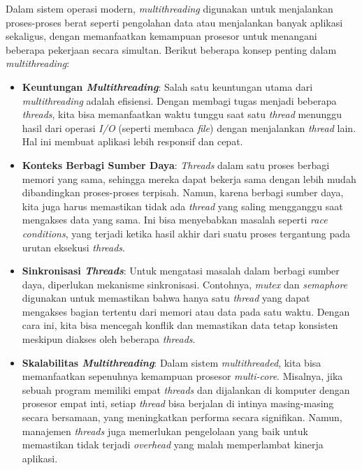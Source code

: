 \documentclass[12pt]{article}
\begin{document}
Dalam sistem operasi modern, \textit{multithreading} digunakan untuk menjalankan proses-proses berat seperti pengolahan data atau menjalankan banyak aplikasi sekaligus, dengan memanfaatkan kemampuan prosesor untuk menangani beberapa pekerjaan secara simultan. Berikut beberapa konsep penting dalam \textit{multithreading}:

\begin{itemize}
    \item \textbf{Keuntungan \textit{Multithreading}}: Salah satu keuntungan utama dari \textit{multithreading} adalah efisiensi. Dengan membagi tugas menjadi beberapa \textit{threads}, kita bisa memanfaatkan waktu tunggu saat satu \textit{thread} menunggu hasil dari operasi \textit{I/O} (seperti membaca \textit{file}) dengan menjalankan \textit{thread} lain. Hal ini membuat aplikasi lebih responsif dan cepat.

    \item \textbf{Konteks Berbagi Sumber Daya}: \textit{Threads} dalam satu proses berbagi memori yang sama, sehingga mereka dapat bekerja sama dengan lebih mudah dibandingkan proses-proses terpisah. Namun, karena berbagi sumber daya, kita juga harus memastikan tidak ada \textit{thread} yang saling mengganggu saat mengakses data yang sama. Ini bisa menyebabkan masalah seperti \textit{race conditions}, yang terjadi ketika hasil akhir dari suatu proses tergantung pada urutan eksekusi \textit{threads}.

    \item \textbf{Sinkronisasi \textit{Threads}}: Untuk mengatasi masalah dalam berbagi sumber daya, diperlukan mekanisme sinkronisasi. Contohnya, \textit{mutex} dan \textit{semaphore} digunakan untuk memastikan bahwa hanya satu \textit{thread} yang dapat mengakses bagian tertentu dari memori atau data pada satu waktu. Dengan cara ini, kita bisa mencegah konflik dan memastikan data tetap konsisten meskipun diakses oleh beberapa \textit{threads}.

    \item \textbf{Skalabilitas \textit{Multithreading}}: Dalam sistem \textit{multithreaded}, kita bisa memanfaatkan sepenuhnya kemampuan prosesor \textit{multi-core}. Misalnya, jika sebuah program memiliki empat \textit{threads} dan dijalankan di komputer dengan prosesor empat inti, setiap \textit{thread} bisa berjalan di intinya masing-masing secara bersamaan, yang meningkatkan performa secara signifikan. Namun, manajemen \textit{threads} juga memerlukan pengelolaan yang baik untuk memastikan tidak terjadi \textit{overhead} yang malah memperlambat kinerja aplikasi.


\end{itemize}
\end{document}
